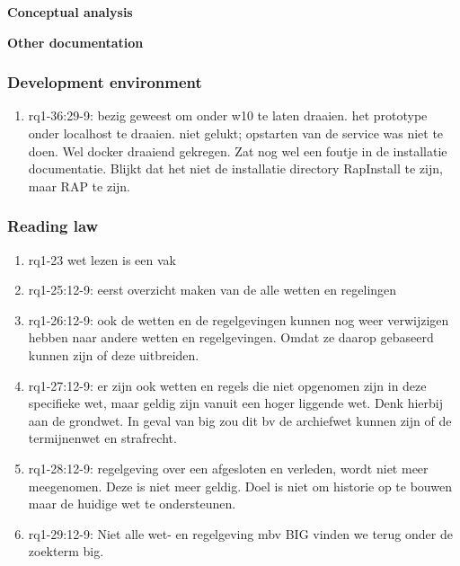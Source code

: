 \textbf{Conceptual analysis}

\textbf{Other documentation}

\subsubsection{Development environment}
\begin{comment}
plaats hier de afgehandelde items.
\end{comment}
\begin{enumerate}
    \item rq1-36:29-9: bezig geweest om onder w10 te laten draaien. het prototype onder localhost te draaien. niet gelukt; opstarten van de service was niet te doen. Wel docker draaiend gekregen. Zat nog wel een foutje in de installatie documentatie. Blijkt dat het niet de installatie directory RapInstall te zijn, maar RAP te zijn.
\end{enumerate}

\subsubsection{Reading law}
\begin{comment}
Hoort dit niet bij rq3?
plaats hier de afgehandelde items.
\end{comment}
\begin{enumerate}
    \item rq1-23 wet lezen is een vak 
    \item rq1-25:12-9: eerst overzicht maken van de alle wetten en regelingen
    \item rq1-26:12-9: ook de wetten en de regelgevingen kunnen nog weer verwijzigen hebben naar andere wetten en regelgevingen. Omdat ze daarop gebaseerd kunnen zijn of deze uitbreiden.
    \item rq1-27:12-9: er zijn ook wetten en regels die niet opgenomen zijn in deze specifieke wet, maar geldig zijn vanuit een hoger liggende wet. 
    Denk hierbij aan de grondwet. 
    In geval van big zou dit bv de archiefwet kunnen zijn of de termijnenwet en strafrecht.
    \item rq1-28:12-9: regelgeving over een afgesloten en verleden, wordt niet meer meegenomen. 
    Deze is niet meer geldig. 
    Doel is niet om historie op te bouwen maar de huidige wet te ondersteunen.
    \item rq1-29:12-9: Niet alle wet- en regelgeving mbv BIG vinden we terug onder de zoekterm big.
\end{enumerate}

